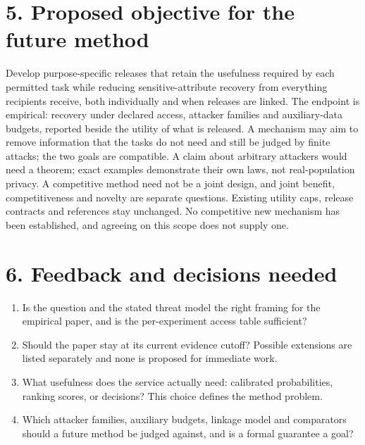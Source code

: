 \documentclass[10pt]{article}
\begin{document}
\section*{5. Proposed objective for the future method}
Develop purpose-specific releases that retain the usefulness required by each permitted task while reducing
sensitive-attribute recovery from everything recipients receive, both individually and when releases are linked. The
endpoint is empirical: recovery under declared access, attacker families and auxiliary-data budgets, reported beside the
utility of what is released. A mechanism may aim to remove information that the tasks do not need and still be judged
by finite attacks; the two goals are compatible. A claim about arbitrary attackers would need a theorem; exact examples
demonstrate their own laws, not real-population privacy. A competitive method need not be a joint design, and joint
benefit, competitiveness and novelty are separate questions. Existing utility caps, release contracts and references
stay unchanged. No competitive new mechanism has been established, and agreeing on this scope does not supply one.

\section*{6. Feedback and decisions needed}
\begin{enumerate}
\item Is the question and the stated threat model the right framing for the empirical paper, and is the per-experiment
access table sufficient?
\item Should the paper stay at its current evidence cutoff? Possible extensions are listed separately and none is
proposed for immediate work.
\item What usefulness does the service actually need: calibrated probabilities, ranking scores, or decisions? This
choice defines the method problem.
\item Which attacker families, auxiliary budgets, linkage model and comparators should a future method be judged
against, and is a formal guarantee a goal?
\end{enumerate}
\end{document}
